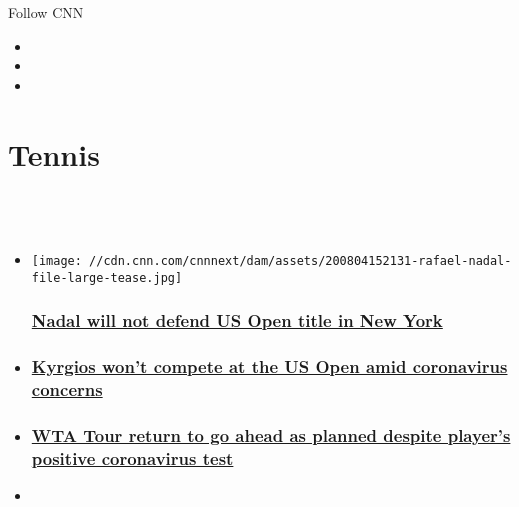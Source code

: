 Follow CNN

\begin{itemize}
\item
\item
\item
\end{itemize}

\hypertarget{tennis}{%
\section{Tennis}\label{tennis}}

\hypertarget{-}{%
\subsection{~}\label{-}}

\begin{itemize}
\item
  \href{/2020/08/04/tennis/rafa-nadal-us-open-spt-intl/index.html}{}

  \texttt{[image: //cdn.cnn.com/cnnnext/dam/assets/200804152131-rafael-nadal-file-large-tease.jpg]}

  \hypertarget{nadal-will-not-defend-us-open-title-in-new-york}{%
  \subsubsection{\texorpdfstring{\href{/2020/08/04/tennis/rafa-nadal-us-open-spt-intl/index.html}{Nadal
  will not defend US Open title in New
  York}}{Nadal will not defend US Open title in New York}}\label{nadal-will-not-defend-us-open-title-in-new-york}}
\item
  \hypertarget{kyrgios-wont-compete-at-the-us-open-amid-coronavirus-concerns}{%
  \subsubsection{\texorpdfstring{\href{/2020/08/02/tennis/nick-kyrgios-us-open-coronavirus-spt-intl/index.html}{Kyrgios
  won't compete at the US Open amid coronavirus
  concerns}}{Kyrgios won't compete at the US Open amid coronavirus concerns}}\label{kyrgios-wont-compete-at-the-us-open-amid-coronavirus-concerns}}
\item
  \hypertarget{wta-tour-return-to-go-ahead-as-planned-despite-players-positive-coronavirus-test}{%
  \subsubsection{\texorpdfstring{\href{/2020/08/01/tennis/wta-palermo-coronavirus-positive-test-tennis-spt-intl/index.html}{WTA
  Tour return to go ahead as planned despite player's positive
  coronavirus
  test}}{WTA Tour return to go ahead as planned despite player's positive coronavirus test}}\label{wta-tour-return-to-go-ahead-as-planned-despite-players-positive-coronavirus-test}}
\item
  \hypertarget{serena-helps-to-donate-425-million-facemasks-to-schools-in-need-}{%
}
\end{itemize}
